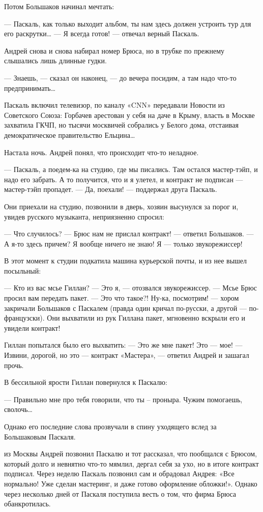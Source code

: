 \documentclass[16pt,a5paper,oneside]{book}
\begin{document}
Потом Большаков начинал мечтать:

— Паскаль, как только выходит альбом, ты нам здесь должен устроить тур для его раскрутки\ldots
— Я всегда готов! — отвечал верный Паскаль.

Андрей снова и снова набирал номер Брюса, но в трубке по прежнему слышались лишь длинные гудки.

— Знаешь, — сказал он наконец, — до вечера посидим, а там надо что-то предпринимать\ldots

Паскаль включил телевизор, по каналу «CNN» передавали Новости из Советского Союза: Горбачев арестован у себя на даче в
Крыму, власть в Москве захватила ГКЧП, но тысячи москвичей собрались у Белого дома, отстаивая демократическое
правительство Ельцина\ldots

Настала ночь. Андрей понял, что происходит что-то неладное.

— Паскаль, а поедем-ка на студию, где мы писались. Там остался мастер-тэйп, и надо его забрать. А то получится, что и я
улетел, и контракт не подписан — мастер-тэйп пропадет.
— Да, поехали! — поддержал друга Паскаль.

Они приехали на студию, позвонили в дверь, хозяин высунулся за порог и, увидев русского музыканта, неприязненно спросил:

— Что случилось?
— Брюс нам не прислал контракт! — ответил Большаков.
— А я-то здесь причем? Я вообще ничего не знаю! Я — только звукорежиссер!

В этот момент к студии подкатила машина курьерской почты, и из нее вышел посыльный:

— Кто из вас мсье Гиллан?
— Это я, — отозвался звукорежиссер.
— Мсье Брюс просил вам передать пакет.
— Это что такое?! Ну-ка, посмотрим! — хором закричали Большаков с Паскалем (правда один кричал по-русски, а другой —
по-французски). Они выхватили из рук Гиллана пакет, мгновенно вскрыли его и увидели контракт!

Гиллан попытался было его выхватить:
— Это же мне пакет! Это — мое!
— Извини, дорогой, но это — контракт «Мастера», — ответил Андрей и зашагал прочь.

В бессильной ярости Гиллан повернулся к Паскалю:

— Правильно мне про тебя говорили, что ты – проныра. Чужим помогаешь, сволочь\ldots

Однако его последние слова прозвучали в спину уходящего вслед за Большаковым Паскаля.

 из Москвы Андрей позвонил Паскалю и тот рассказал, что пообщался с Брюсом, который долго и невнятно что-то
мямлил, дергал себя за ухо, но в итоге контракт подписал. Через неделю Паскаль позвонил сам и обрадовал Андрея: «Все
нормально! Уже сделан мастеринг, и даже готово оформление обложки!». Однако через несколько дней от Паскаля поступила
весть о том, что фирма Брюса обанкротилась.
\end{document}
